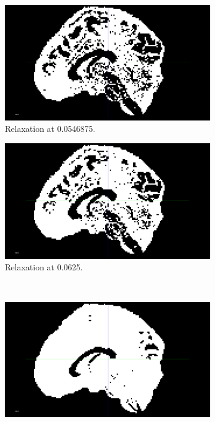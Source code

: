 \documentclass[a4paper,11pt]{report}
\begin{document}
      \begin{figure}[H]
        \centering

        \begin{subfigure}[t]{.49\textwidth}
          \includegraphics[width=1\linewidth]{imgs/eg_00_00_00_00546875.png}
          \caption{Relaxation at 0.0546875.}
          \label{subfig:perf-iso-0054}
        \end{subfigure}\hfill%
        \begin{subfigure}[t]{.49\textwidth}
          \includegraphics[width=1\linewidth]{imgs/eg_00_00_00_00625.png}
          \caption{Relaxation at 0.0625.}
          \label{subfig:perf-iso-0062}
        \end{subfigure}\hfill\\
        \begin{subfigure}[t]{.49\textwidth}
          \includegraphics[width=1\linewidth]{imgs/eg_00_00_00_0125.png}

\end{subfigure}
\end{figure}
\end{document}
